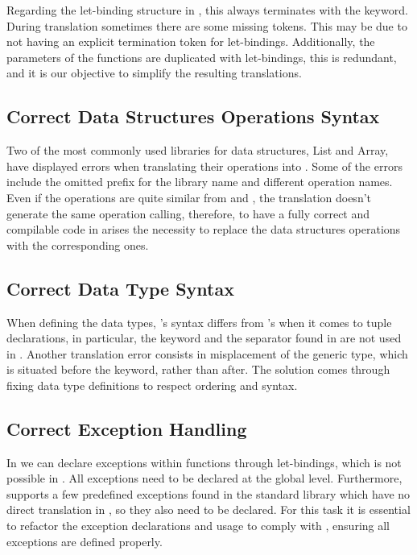 Regarding the let-binding structure in \cml, this always terminates with the  keyword. During translation sometimes there 
are some missing  tokens. This may be due to \ocaml not having an explicit termination token for let-bindings. Additionally, 
the parameters of the functions are duplicated with let-bindings, this is redundant, and it is our objective to simplify the resulting 
translations.

\subsection{Correct Data Structures Operations Syntax}

Two of the most commonly used libraries for data structures, List and Array, have displayed errors when translating their operations into 
\cml. Some of the errors include the omitted prefix for the library name and different operation names. 
Even if the operations are quite similar from \ocaml and \cml, the translation doesn't generate the same operation calling, therefore, to 
have a fully correct and compilable code in \cml arises the necessity to replace the data structures operations with the corresponding 
ones.

\subsection{Correct Data Type Syntax}

When defining the data types, \cml's syntax differs from \ocaml's when it comes to tuple declarations, in particular, 
the  keyword and the separator \inlinecode{*} found in \ocaml are not used in \cml. Another translation error consists in
misplacement of the generic type, which is situated before the  keyword, rather than after. The solution comes 
through fixing data type definitions to respect \cml ordering and syntax.

\subsection{Correct Exception Handling}

In \ocaml we can declare exceptions within functions through let-bindings, which is not possible in \cml. All exceptions need to be 
declared at the global level. Furthermore, \ocaml supports a few predefined exceptions found in the standard library which have no 
direct translation in \cml, so they also need to be declared. For this task it is essential to refactor the exception declarations 
and usage to comply with \cml, ensuring all exceptions are defined properly.

